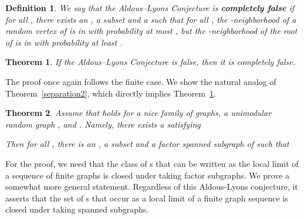 \documentclass[12pt,a4paper]{article}
\newtheorem{Def}{Definition}
\newtheorem{Theorem}{Theorem}
\renewcommand{\:}{\colon}
\begin{document}
\begin{Def}\label{def:AL}
We say that the Aldous--Lyons Conjecture is \textbf{completely false} if for all , there exists an , a subset  and a   such that for all , the -neighborhood of a random vertex of  is in  with probability at most , but the -neighborhood of the root of  is in  with probability at least .
\end{Def}

\begin{Theorem}\label{thm:strAL}
If the Aldous--Lyons Conjecture is false, then it is completely false.
\end{Theorem}


The proof once again follows the finite case. We show the natural analog of Theorem~\ref{separation2}, which directly implies Theorem~\ref{thm:strAL}. 

\begin{Theorem} \label{separation2uni}
Assume that  holds for a nice family  of graphs, a unimodular random graph , and . 
Namely, there exists a  satisfying

Then for all , there is an , a subset  and a factor spanned subgraph  of  such that 

\end{Theorem}

For the proof, we need that the class of s that can be written as the local limit of a sequence of finite graphs is closed under taking factor subgraphs. 
We prove a somewhat more general statement. 
Regardless of this Aldous-Lyons conjecture, it asserts that the set of s that occur as a local limit of a finite graph sequence is closed under taking  spanned subgraphs. 
\end{document}
